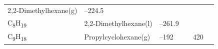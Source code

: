\documentclass[
  9pt,
]{extbook}
\theoremstyle{definition}
\theoremstyle{definition}
\theoremstyle{definition}
\theoremstyle{remark}
\begin{document}
\begin{longtable}[]{@{}llllll@{}}
\begin{minipage}[t]{0.17\columnwidth}
2,2-Dimethylhexane(g)\strut
\end{minipage} & \begin{minipage}[t]{0.15\columnwidth}\raggedright
--224.5\strut
\end{minipage} & \begin{minipage}[t]{0.15\columnwidth}\raggedright
\strut
\end{minipage} & \begin{minipage}[t]{0.14\columnwidth}\raggedright
\strut
\end{minipage} & \begin{minipage}[t]{0.14\columnwidth}\raggedright
\strut
\end{minipage}\tabularnewline
\begin{minipage}[t]{0.07\columnwidth}\raggedright
C\textsubscript{8}H\textsubscript{19}\strut
\end{minipage} & \begin{minipage}[t]{0.17\columnwidth}\raggedright
2,2-Dimethylhexane(l)\strut
\end{minipage} & \begin{minipage}[t]{0.15\columnwidth}\raggedright
--261.9\strut
\end{minipage} & \begin{minipage}[t]{0.15\columnwidth}\raggedright
\strut
\end{minipage} & \begin{minipage}[t]{0.14\columnwidth}\raggedright
\strut
\end{minipage} & \begin{minipage}[t]{0.14\columnwidth}\raggedright
\strut
\end{minipage}\tabularnewline
\begin{minipage}[t]{0.07\columnwidth}\raggedright
C\textsubscript{9}H\textsubscript{18}\strut
\end{minipage} & \begin{minipage}[t]{0.17\columnwidth}\raggedright
Propylcyclohexane(g)\strut
\end{minipage} & \begin{minipage}[t]{0.15\columnwidth}\raggedright
--192\strut
\end{minipage} & \begin{minipage}[t]{0.15\columnwidth}\raggedright
\strut
\end{minipage} & \begin{minipage}[t]{0.14\columnwidth}\raggedright
420\strut
\end{minipage} & \begin{minipage}[t]{0.14\columnwidth}\raggedright

\end{minipage}
\end{longtable}
\end{document}
